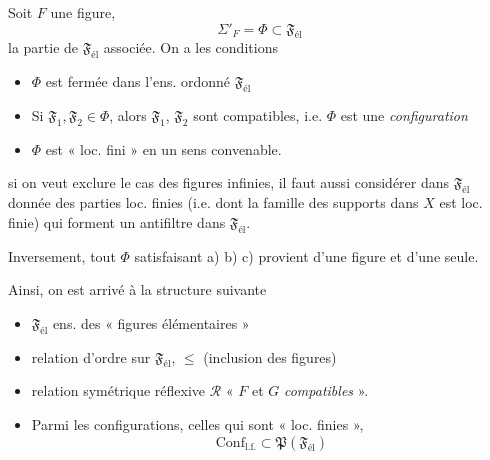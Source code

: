 \documentclass[11pt,a4paper]{article}
\begin{document}
Soit $F$ une figure, 
\[
  \Sigma'_F = \Phi \subset \mathfrak{F}_{\mathrm{él}}
\]
la partie de $\mathfrak{F}_{\mathrm{él}}$ associée.  On a les conditions
\begin{itemize}
  \item[a)] $\Phi$ est fermée dans l'ens. ordonné $\mathfrak{F}_{\mathrm{él}}$
  \item[b)] Si  $\mathfrak{F}_1, \mathfrak{F}_2 \in \Phi$,  alors $\mathfrak{F}_1$, $\mathfrak{F}_2$ sont compatibles, i.e. $\Phi$ est une \emph{configuration}
  \item[c)] $\Phi$ est « loc. fini » en un sens convenable.
\end{itemize}

\ill{} si on veut exclure le cas des figures infinies, il faut aussi considérer dans $\mathfrak{F}_{\mathrm{él}}$ \ill{} donnée des parties loc. finies (i.e. dont la famille des supports dans $X$ est loc. finie) qui forment un antifiltre dans $\mathfrak{F}_{\mathrm{él}}$.

Inversement, tout $\Phi$ satisfaisant a) b) c) provient d'une figure et d'une seule.

Ainsi, on est arrivé à la structure suivante
\begin{itemize}
  \item[(1)] $\mathfrak{F}_{\mathrm{él}}$ ens. des « figures élémentaires »
  \item[(2)] relation d'ordre sur $\mathfrak{F}_{\mathrm{él}}$, $\leq$ (inclusion des figures)
  \item[(3)] relation symétrique réflexive $\mathcal{R}$ \struck{\ill{}} « $F$ et $G$ \emph{compatibles} ». \struck{\ill{}} 
  \item[(4)]  Parmi les configurations, \struck{\ill{}} \struck{\ill{}} celles qui sont « loc. finies »,  
  \[
    \mathrm{Conf}_{\mathrm{l.f.}} \subset \mathfrak{P}(\mathfrak{F}_{\mathrm{él}})
  \]
\end{itemize}
\end{document}
